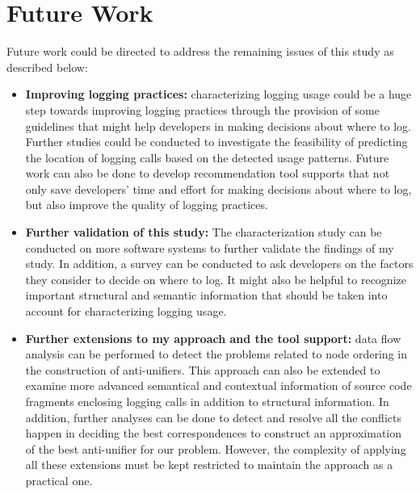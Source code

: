 \section{Future Work}  \label{fw}
Future work could be directed to address the remaining issues of this study as described below:
\begin{itemize} [leftmargin=.5in]

\item \textbf{Improving logging practices:} characterizing logging usage could be a huge step towards improving logging practices through the provision of some guidelines that might help developers in making decisions about where to log. Further studies could be conducted to investigate the feasibility of predicting the location of logging calls based on the detected usage patterns. Future work can also be done to develop recommendation tool supports that not only save developers’ time and effort for making decisions about where to log, but also improve the quality of logging practices.


\item \textbf{Further validation of this study:} The characterization study can be conducted on more software systems to further validate the findings of my study. In addition, a survey can be conducted to ask developers on the factors they consider to decide on where to log. It might also be helpful to recognize important structural and semantic information that should be taken into account for characterizing logging usage.


\item \textbf{Further extensions to my approach and the tool support:} data flow analysis can be performed to detect the problems related to node ordering in the  construction of anti-unifiers. This approach can also be extended to examine more advanced semantical and contextual information of source code fragments enclosing logging calls in addition to structural information. In addition, further analyses can be done to detect and resolve all the conflicts happen in deciding the best correspondences to construct an approximation of the best anti-unifier for our problem. However, the complexity of applying all these extensions must be kept restricted to maintain the approach as a practical one.


\end{itemize}
